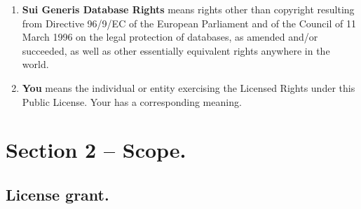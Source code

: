 \documentclass[a4paper, 12pt]{article}
\begin{document}
\begin{enumerate}[label=\alph*.]
\item \textbf{Sui Generis Database Rights} means rights other than copyright resulting from Directive 96/9/EC of the European Parliament and of the Council of 11 March 1996 on the legal protection of databases, as amended and/or succeeded, as well as other essentially equivalent rights anywhere in the world.
\item \textbf{You} means the individual or entity exercising the Licensed Rights under this Public License. Your has a corresponding meaning.
\end{enumerate}

\section*{Section 2 – Scope.}

\subsection{License grant.}
\end{document}
